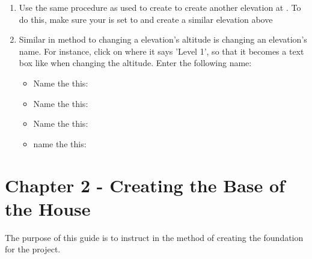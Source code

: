 \documentclass{tufte-book} %
\begin{document}
\begin{enumerate}
	\item Use the same procedure as used to create  to create another elevation at . To do this, make sure your  is set to  and create a similar elevation above 
	\item Similar in method to changing a elevation's altitude is changing an elevation's name. For instance, click on  where it says 'Level 1', so that it becomes a text box like when changing the altitude. Enter the following name: 
	\begin{itemize}
		\item Name the  this: 
		\item Name the  this: 
		\item Name the  this: 
		\item name the  this: 
	\end{itemize}
\end{enumerate}

\chapter{Chapter 2 - Creating the Base of the House}
\label{ch:2}
The purpose of this guide is to instruct in the method of creating the foundation for the project.
\end{document}
